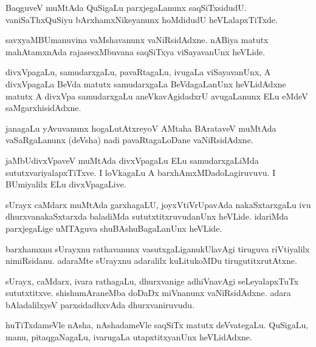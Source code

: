 \documentclass{article}
\begin{document}
\begin{mn}
BaqguveV muMtAda QuSigaLu parxjegaLanunx
saqSiTxsidudU. vaniSaThxQuSiyu bArxhamxNikeyanunx hoMdidudU heVLalapxTiTxde.
\end{mn}

\begin{mn}
savxyaMBUmanuvina vaMshavanunx vaNiRsidAdxne. nABiya matutx
mahAtamxnAda rajasesxMbuvana saqSiTxya viSayavanUnx heVLide.
\end{mn}

\begin{mn}
divxVpagaLu, samudarxgaLu, pavaRtagaLu, ivugaLa viSayavanUnx, A
divxVpagaLa BeVda matutx samudarxgaLa BeVdagaLanUnx heVLidAdxne matutx
A divxVpa samudarxgaLu aneVkavAgidadxrU avugaLanunx ELu eMdeV saMgarxhisidAdxne.
\end{mn}

\begin{mn}
janagaLu yAvuvanunx hogaLutAtxreyoV AMtaha BArataveV muMtAda
vaSaRgaLanunx (deVsha) nadi pavaRtagaLoDane vaNiRsidAdxne.
\end{mn}

\begin{mn}
jaMbUdivxVpaveV muMtAda divxVpagaLu ELu samudarxgaLiMda
sututxvariyalapxTiTxve. I loVkagaLu A barxhAmxMDadoLagiruvuvu. I
BUmiyalilx ELu divxVpagaLive.
\end{mn}

\begin{mn}
sUrayx caMdarx muMtAda garxhagaLU, joyxVtiVrUpavAda nakaSxtarxgaLu ivu
dhurxvanakaSxtarxda baladiMda sututxtitxruvudanUnx heVLide. idariMda
parxjegaLige uMTAguva shuBAshuBagaLanUnx heVLide.
\end{mn}

\begin{mn}
barxhamxnu sUrayxnu rathavanunx vasutxgaLiganukUlavAgi tiruguva
riVtiyalilx nimiRsidanu. adaraMte sUrayxnu adaralilx kuLitukoMDu tirugutitxrutAtxne.
\end{mn}

\begin{mn}
sUrayx, caMdarx, ivara rathagaLu, dhurxvanige adhiVnavAgi
seLeyalapxTuTx sututxtitxve. shishumAraneMba doDaDx miVnanunx
vaNiRsidAdxne. adara bAladalilxyeV parxsidadhxvAda dhurxvaniruvudu.
\end{mn}

\begin{mn}
huTiTxdameVle nAsha, nAshadameVle saqSiTx matutx
deVvategaLu. QuSigaLu, manu, pitaqgaNagaLu, ivarugaLa utapxtitxyanUnx heVLidAdxne.
\end{mn}
\end{document}
